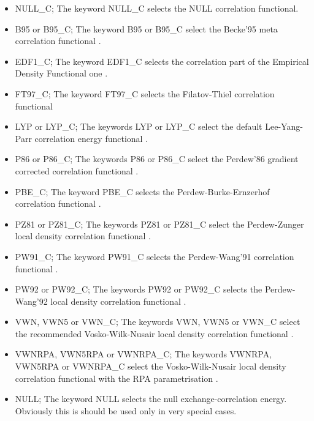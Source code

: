\documentclass[11pt,fleqn]{article}
\begin{document}
\begin{itemize}
\item NULL\_C;
The keyword NULL\_C selects the NULL correlation functional.

\item B95 or B95\_C;
The keyword B95 or B95\_C select the Becke'95 meta correlation functional
\cite{becke96}.

\item EDF1\_C;
The keyword EDF1\_C selects the correlation part of the Empirical Density
Functional one \cite{adamson98}.

\item FT97\_C;
The keyword FT97\_C selects the Filatov-Thiel correlation functional
\cite{filatov97c}

\item LYP or LYP\_C;
The keywords LYP or LYP\_C select the default Lee-Yang-Parr correlation 
energy functional \cite{lyp}.

\item P86 or P86\_C;
The keywords P86 or P86\_C select the Perdew'86 gradient corrected
correlation functional \cite{perdew86}.

\item PBE\_C;
The keyword PBE\_C selects the Perdew-Burke-Ernzerhof correlation functional
\cite{perdew96}.

\item PZ81 or PZ81\_C;
The keywords PZ81 or PZ81\_C select the Perdew-Zunger local density 
correlation functional \cite{perdew81}.

\item PW91\_C;
The keyword PW91\_C selects the Perdew-Wang'91 correlation functional
\cite{perdew92}.

\item PW92 or PW92\_C;
The keywords PW92 or PW92\_C selects the Perdew-Wang'92 local density
correlation functional \cite{perdew92a}.

\item VWN, VWN5 or VWN\_C;
The keywords VWN, VWN5 or VWN\_C select the recommended Vosko-Wilk-Nusair local
density correlation functional \cite{vosko80}.

\item VWNRPA, VWN5RPA or VWNRPA\_C;
The keywords VWNRPA, VWN5RPA or VWNRPA\_C select the Vosko-Wilk-Nusair local 
density correlation functional with the RPA parametrisation \cite{vosko80}.

\item NULL;
The keyword NULL selects the null exchange-correlation energy. 
Obviously this is should be used only in very special cases.


\end{itemize}
\end{document}
